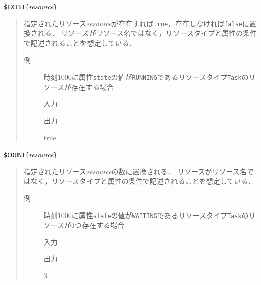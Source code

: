 \vspace{1zw}
{\nopagebreak
\noindent
\verb|$EXIST{|\textit{resource}\verb|}|
\vspace{-0.75zw}
\begin{quote}
指定されたリソース{\it resource}が存在すれば{\tt true}，存在しなければ{\tt false}に置換される．
リソースがリソース名ではなく，リソースタイプと属性の条件で記述されることを想定している．

\vspace{-1zw}
\begin{description}
\item[例] 時刻1000に属性{\tt state}の値が{\tt RUNNING}であるリソースタイプ{\tt Task}のリソースが存在する場合

\hspace*{-1zw}入力\vspace{-1.75zw}
\hspace*{-1zw}出力\vspace{-1.75zw}
\begin{EBNF}
true
\end{EBNF}
\end{description}

\end{quote}
}
{\nopagebreak
\noindent
\verb|$COUNT{|\textit{resource}\verb|}|
\vspace{-0.75zw}
\begin{quote}
指定されたリソース{\it resource}の数に置換される．
リソースがリソース名ではなく，リソースタイプと属性の条件で記述されることを想定している．

\vspace{-1zw}
\begin{description}
\item[例] 時刻1000に属性{\tt state}の値が{\tt WAITING}であるリソースタイプ{\tt Task}のリソースが3つ存在する場合

\hspace*{-1zw}入力\vspace{-1.75zw}
\hspace*{-1zw}出力\vspace{-1.75zw}
\begin{EBNF}
3
\end{EBNF}
\end{description}

\end{quote}
}
